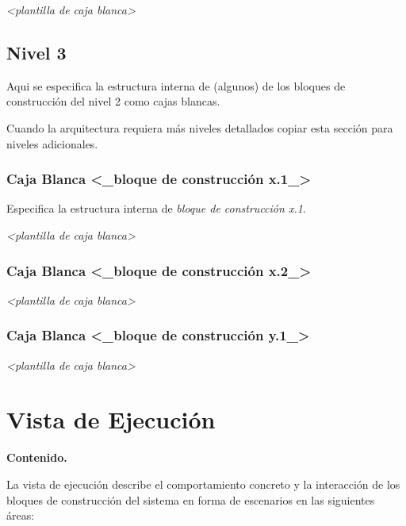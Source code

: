 \documentclass[]{article}
\begin{document}
\emph{\textless{}plantilla de caja blanca\textgreater{}}

\hypertarget{_nivel_3}{%
\subsection{Nivel 3}\label{_nivel_3}}

Aqui se especifica la estructura interna de (algunos) de los bloques de
construcción del nivel 2 como cajas blancas.

Cuando la arquitectura requiera más niveles detallados copiar esta
sección para niveles adicionales.

\hypertarget{_caja_blanca_bloque_de_construcci_n_x_1}{%
\subsubsection{Caja Blanca \textless{}\_bloque de construcción
x.1\_\textgreater{}}\label{_caja_blanca_bloque_de_construcci_n_x_1}}

Especifica la estructura interna de \emph{bloque de construcción x.1}.

\emph{\textless{}plantilla de caja blanca\textgreater{}}

\hypertarget{_caja_blanca_bloque_de_construcci_n_x_2}{%
\subsubsection{Caja Blanca \textless{}\_bloque de construcción
x.2\_\textgreater{}}\label{_caja_blanca_bloque_de_construcci_n_x_2}}

\emph{\textless{}plantilla de caja blanca\textgreater{}}

\hypertarget{_caja_blanca_bloque_de_construcci_n_y_1}{%
\subsubsection{Caja Blanca \textless{}\_bloque de construcción
y.1\_\textgreater{}}\label{_caja_blanca_bloque_de_construcci_n_y_1}}

\emph{\textless{}plantilla de caja blanca\textgreater{}}

\hypertarget{section-runtime-view}{%
\section{Vista de Ejecución}\label{section-runtime-view}}

\textbf{Contenido.}

La vista de ejecución describe el comportamiento concreto y la
interacción de los bloques de construcción del sistema en forma de
escenarios en las siguientes áreas:
\end{document}
